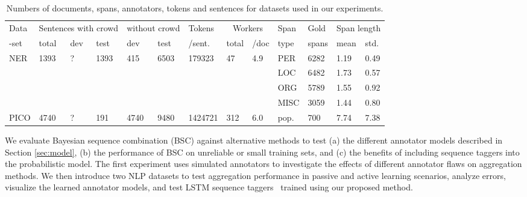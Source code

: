 \begin{table}[h]
\small
\begin{tabularx}{\textwidth}{| X || X | X | X | X | X | l || l | l || X | X | X | X |} \hline
Data & \multicolumn{3}{c|}{Sentences with crowd} & \multicolumn{2}{c|}{without crowd} & Tokens & \multicolumn{2}{c||}{Workers} & Span & Gold & \multicolumn{2}{c|}{Span length}  \\
-set & total & dev & test & dev & test %
& /sent. & total & /doc & type & spans & mean & std.  \\
\hline
NER & 1393 & ? & 1393 & 415 & 6503 & 179323  & 47 & 4.9 & PER & 6282 & 1.19 & 0.49 \\
&       & & & & & & &  & LOC  & 6482 & 1.73 & 0.57\\
&       & & & & & & & & ORG  & 5789 & 1.55 & 0.92\\
&       & & & & & & & & MISC & 3059 & 1.44 & 0.80\\ \hline
PICO & 4740 & ? & 191 & 4740 & 9480 & 1424721 & 312 & 6.0 & pop. & 700 & 7.74 & 7.38  \\ \hline
\end{tabularx}
\label{tab:datasets}
\caption{Numbers of documents, spans, annotators, tokens and sentences for datasets used in our experiments.}
\end{table}
We evaluate Bayesian sequence combination (BSC) against alternative methods to test 
 (a) the different annotator models described in Section \ref{sec:model},
 (b) the performance of BSC on unreliable or small training sets,
and (c) the benefits of including sequence taggers into the probabilistic model.
The first experiment uses simulated annotators to investigate the effects of different annotator flaws on aggregation methods. 
We then introduce two NLP datasets to 
test aggregation performance in passive and active learning scenarios, 
analyze errors,
visualize the learned annotator models,
and test LSTM 
sequence taggers~\cite{lample2016neural}
trained using our proposed method.



